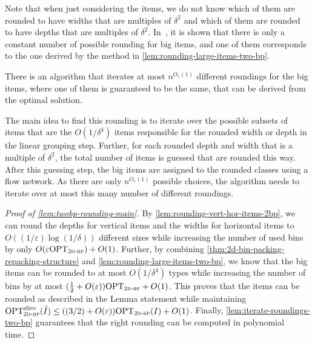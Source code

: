 \documentclass[a4paper,UKenglish,cleveref, autoref, thm-restate]{lipics-v2021}
\newcommand{\eps}{\varepsilon}
\newcommand{\opt}{\mathrm{OPT}}
\newcommand{\twobp}{\textsc{2d-bp}\xspace}
\newcommand{\bigy}{big\xspace}
\begin{document}
Note that when just considering the items, we do not know which of them are rounded to have widths that are multiples of $\delta^2$ and which of them are rounded to have depths that are multiples of $\delta^2$. 
In~\cite{jansen2016new}, it is shown that there is only a constant number of possible rounding for \bigy items, and one of them corresponds to the one derived by the method in \cref{lem:rounding-large-items-two-bp}.

\begin{lemma}
\label{lem:iterate-roundings-two-bp}
There is an algorithm that iterates at most $n^{{O}_{\eps}(1)}$ different roundings for the \bigy items, where one of them is guaranteed to be the same, that can be derived from the optimal solution.
\end{lemma}

The main idea to find this rounding is to iterate over the possible subsets of items that are the $O(1/\delta^4)$ items responsible for the rounded width or depth in the linear grouping step. 
Further, for each rounded depth and width that is a multiple of $\delta^2$, the total number of items is guessed that are rounded this way.
After this guessing step, the \bigy items are assigned to the rounded classes using a flow network.
As there are only $n^{{O}_{\eps}(1)}$ possible choices, the algorithm needs to iterate over at most this many number of different roundings.



\begin{proof}[Proof of \cref{lem:twobp-rounding-main}]
    By \cref{lem:rounding-vert-hor-items-2bp}, we can round the depths for vertical items and the widths for horizontal items to $O((1/\eps)\log(1/\delta))$ different sizes while increasing the number of used bins by only $O(\eps \opt_{\twobp}) +O(1)$.
    Further, by combining \cref{thm:2d-bin-packing-repacking-structure} and \cref{lem:rounding-large-items-two-bp}, we know that the \bigy items can be rounded to at most $O(1/\delta^4)$ types while increasing the number of bins by at most $(\frac{1}{2} + O(\eps))\opt_{\twobp} + O(1)$.
    This proves that the items can be rounded as described in the Lemma statement while maintaining $\opt_{\twobp}^{\mathrm{slice}}(\tilde{I}) \leq ((3/2)+O(\eps))\opt_{\twobp}(I) + O(1)$.
    Finally, \cref{lem:iterate-roundings-two-bp} guarantees that the right rounding can be computed in polynomial time.
\end{proof}
\end{document}
